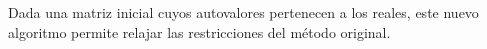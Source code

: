 \vspace{1em}
Dada una matriz inicial cuyos autovalores pertenecen a los reales, este nuevo algoritmo permite relajar las restricciones del método original.




% 


